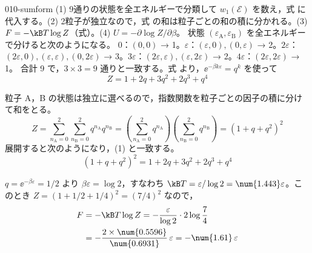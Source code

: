 \documentclass[uplatex,dvipdfmx,a4paper,11pt]{jsarticle}
\begin{document}
\kaitouhen
{}
\begin{kaisetsu}{010-sumform}
\houshin (1) 9通りの状態を全エネルギーで分類して $w_{1}(\mathcal{E})$ を数え，式 に代入する。(2) 2粒子が独立なので，式 の和は粒子ごとの和の積に分かれる。(3) $F=-\kB T\log Z$（式）。(4) $U=-\partial\log Z/\partial\beta$。
\keisan
{} 状態 $(\varepsilon_{\mathrm{A}},\varepsilon_{\mathrm{B}})$ を全エネルギーで分けると次のようになる。
$0$：$(0,0)$ → 1。$\varepsilon$：$(\varepsilon,0),(0,\varepsilon)$ → 2。$2\varepsilon$：$(2\varepsilon,0),(\varepsilon,\varepsilon),(0,2\varepsilon)$ → 3。$3\varepsilon$：$(2\varepsilon,\varepsilon),(\varepsilon,2\varepsilon)$ → 2。$4\varepsilon$：$(2\varepsilon,2\varepsilon)$ → 1。
合計 9 で，$3\times3=9$ 通りと一致する。式 より，$\ee^{-\beta k\varepsilon}=q^{k}$ を使って
\[Z=1+2q+3q^{2}+2q^{3}+q^{4}\]

 粒子 A，B の状態は独立に選べるので，指数関数を粒子ごとの因子の積に分けて和をとる。
\[Z=\sum_{n_{\mathrm{A}}=0}^{2}\sum_{n_{\mathrm{B}}=0}^{2}q^{n_{\mathrm{A}}}q^{n_{\mathrm{B}}}=\left(\sum_{n_{\mathrm{A}}=0}^{2}q^{n_{\mathrm{A}}}\right)\left(\sum_{n_{\mathrm{B}}=0}^{2}q^{n_{\mathrm{B}}}\right)=\left(1+q+q^{2}\right)^{2}\]
展開すると次のようになり，(1) と一致する。
\[\left(1+q+q^{2}\right)^{2}=1+2q+3q^{2}+2q^{3}+q^{4}\]

 $q=\ee^{-\beta\varepsilon}=1/2$ より $\beta\varepsilon=\log2$，すなわち $\kB T=\varepsilon/\log2=\num{1.443}\varepsilon$。このとき $Z=(1+1/2+1/4)^{2}=(7/4)^{2}$ なので，
\begin{align*}
F&=-\kB T\log Z=-\frac{\varepsilon}{\log2}\cdot2\log\frac{7}{4}\\
&=-\frac{2\times\num{0.5596}}{\num{0.6931}}\,\varepsilon=-\num{1.61}\,\varepsilon
\end{align*}


\end{kaisetsu}
\end{document}
